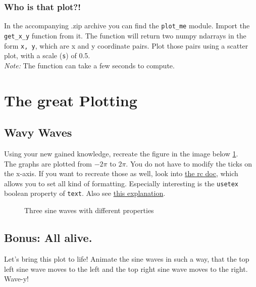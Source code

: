\subsubsection{Who is that plot?!}
In the accompanying .zip archive you can find the \verb|plot_me| module. 
Import the \verb|get_x_y| function from it. The function will return two
numpy ndarrays in the form \verb|x, y|, which are x and y coordinate pairs.
Plot those pairs using a scatter plot, with a scale (\verb|s|) of 0.5.\\
\emph{Note:} The function can take a few seconds to compute.


\section{The great Plotting}
\subsection{Wavy Waves}
Using your new gained knowledge, recreate the figure in the image  
below \ref{fig:sines}.\\
The graphs are plotted from $-2\pi$ to $2\pi$. You do not have to modify
the ticks on the x-axis. If you want to recreate those as well, look into
\href{https://matplotlib.org/api/_as_gen/matplotlib.pyplot.rc.html}{the rc doc},
which allows you to set all kind of formatting. Especially interesting is the 
\texttt{usetex} boolean property of \texttt{text}. Also see
\href{https://matplotlib.org/users/usetex.html}{this explanation}.

\begin{figure}[h!]
	\caption{Three sine waves with different properties}
	\label{fig:sines}
\end{figure}

\subsection{Bonus: All alive.}
Let's bring this plot to life! Animate the sine waves in such a way, that
the top left sine wave moves to the left and the top right sine wave moves
to the right. Wave-y!
